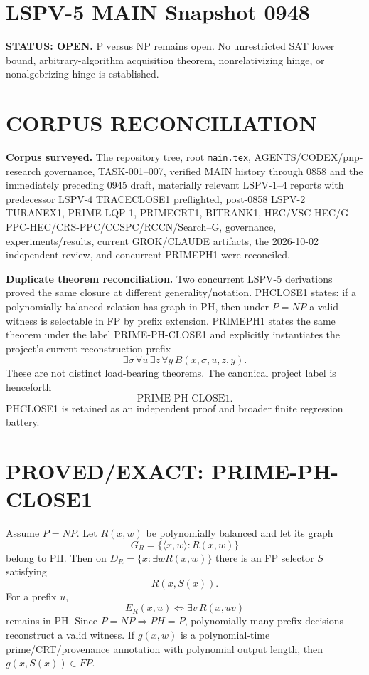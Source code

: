 \documentclass[11pt]{article}
\begin{document}
\section*{LSPV-5 MAIN Snapshot 0948}

\textbf{STATUS: OPEN.} P versus NP remains open. No unrestricted SAT lower bound,
arbitrary-algorithm acquisition theorem, nonrelativizing hinge, or nonalgebrizing hinge is established.

\section*{CORPUS RECONCILIATION}
\textbf{Corpus surveyed.}
The repository tree, root \texttt{main.tex}, AGENTS/CODEX/pnp-research governance, TASK-001--007,
verified MAIN history through 0858 and the immediately preceding 0945 draft, materially relevant
LSPV-1--4 reports with predecessor LSPV-4 TRACECLOSE1 preflighted, post-0858 LSPV-2 TURANEX1,
PRIME-LQP-1, PRIMECRT1, BITRANK1, HEC/VSC-HEC/G-PPC-HEC/CRS-PPC/CCSPC/RCCN/Search--G,
governance, experiments/results, current GROK/CLAUDE artifacts, the 2026-10-02 independent review,
and concurrent PRIMEPH1 were reconciled.

\textbf{Duplicate theorem reconciliation.}
Two concurrent LSPV-5 derivations proved the same closure at different generality/notation.
PHCLOSE1 states: if a polynomially balanced relation has graph in PH, then under \(P=NP\) a valid
witness is selectable in FP by prefix extension. PRIMEPH1 states the same theorem under the label
PRIME-PH-CLOSE1 and explicitly instantiates the project's current reconstruction prefix
\[
\exists\sigma\,\forall u\,\exists z\,\forall y\,B(x,\sigma,u,z,y).
\]
These are not distinct load-bearing theorems. The canonical project label is henceforth
\[
\boxed{\text{PRIME-PH-CLOSE1}.}
\]
PHCLOSE1 is retained as an independent proof and broader finite regression battery.

\section*{PROVED/EXACT: PRIME-PH-CLOSE1}
Assume \(P=NP\). Let \(R(x,w)\) be polynomially balanced and let its graph
\[
G_R=\{\langle x,w\rangle:R(x,w)\}
\]
belong to PH. Then on \(D_R=\{x:\exists w R(x,w)\}\) there is an FP selector \(S\) satisfying
\[
R(x,S(x)).
\]
For a prefix \(u\),
\[
E_R(x,u)\iff\exists v\,R(x,uv)
\]
remains in PH. Since \(P=NP\Rightarrow PH=P\), polynomially many prefix decisions reconstruct a
valid witness. If \(g(x,w)\) is a polynomial-time prime/CRT/provenance annotation with polynomial
output length, then \(g(x,S(x))\in FP\).
\end{document}
